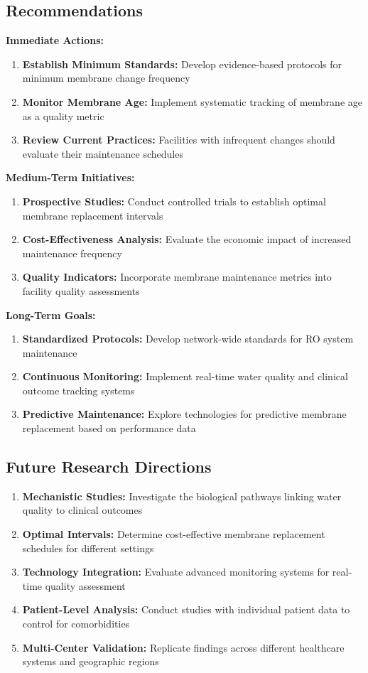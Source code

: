 \documentclass[11pt,a4paper]{article}
\begin{document}
\subsection{Recommendations}

\textbf{Immediate Actions:}
\begin{enumerate}
    \item \textbf{Establish Minimum Standards:} Develop evidence-based protocols for minimum membrane change frequency
    \item \textbf{Monitor Membrane Age:} Implement systematic tracking of membrane age as a quality metric
    \item \textbf{Review Current Practices:} Facilities with infrequent changes should evaluate their maintenance schedules
\end{enumerate}

\textbf{Medium-Term Initiatives:}
\begin{enumerate}
    \item \textbf{Prospective Studies:} Conduct controlled trials to establish optimal membrane replacement intervals
    \item \textbf{Cost-Effectiveness Analysis:} Evaluate the economic impact of increased maintenance frequency
    \item \textbf{Quality Indicators:} Incorporate membrane maintenance metrics into facility quality assessments
\end{enumerate}

\textbf{Long-Term Goals:}
\begin{enumerate}
    \item \textbf{Standardized Protocols:} Develop network-wide standards for RO system maintenance
    \item \textbf{Continuous Monitoring:} Implement real-time water quality and clinical outcome tracking systems
    \item \textbf{Predictive Maintenance:} Explore technologies for predictive membrane replacement based on performance data
\end{enumerate}

\subsection{Future Research Directions}

\begin{enumerate}
    \item \textbf{Mechanistic Studies:} Investigate the biological pathways linking water quality to clinical outcomes
    \item \textbf{Optimal Intervals:} Determine cost-effective membrane replacement schedules for different settings
    \item \textbf{Technology Integration:} Evaluate advanced monitoring systems for real-time quality assessment
    \item \textbf{Patient-Level Analysis:} Conduct studies with individual patient data to control for comorbidities
    \item \textbf{Multi-Center Validation:} Replicate findings across different healthcare systems and geographic regions
\end{enumerate}
\end{document}
